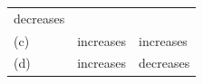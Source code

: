 \begin{enumerate}[noitemsep, label=\textbf{\arabic*}. ]
\begin{enumerate}[noitemsep, label=\textbf{\alph*}. ]
{\begin{tabular}[t]{|l|l|l|}
        decreases%
     \tabularnewline\cline{1-1}\cline{2-2}\cline{3-3}
    
    
        (c) &
    
    
        increases &
    
    
        increases%
     \tabularnewline\cline{1-1}\cline{2-2}\cline{3-3}
    
    
        (d) &
    
    
        increases &
    
    
        decreases%
     \tabularnewline\cline{1-1}\cline{2-2}\cline{3-3}
    \end{tabular}} %
      \addtocounter{footnote}{-0}
      
    

\end{enumerate}
\end{enumerate}
